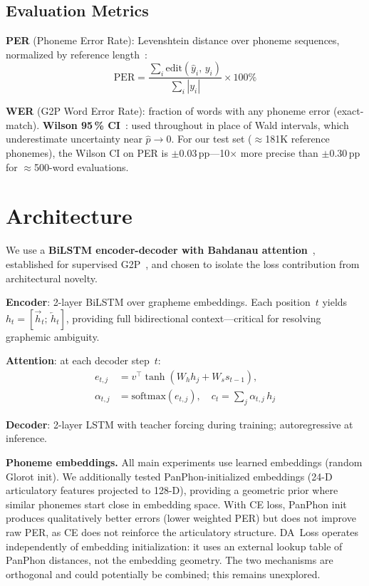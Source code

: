 \documentclass[conference]{IEEEtran}
\begin{document}
\subsection{Evaluation Metrics}

\textbf{PER} (Phoneme Error Rate): Levenshtein distance over phoneme
sequences, normalized by reference length~\cite{bisani2008joint}:
\begin{equation}
  \mathrm{PER} = \frac{\displaystyle\sum_i \mathrm{edit}(\hat{y}_i,\,
                 y_i)}{\displaystyle\sum_i |y_i|} \times 100\%
  \label{eq:per}
\end{equation}

\textbf{WER} (G2P Word Error Rate): fraction of words with any
phoneme error (exact-match).
\textbf{Wilson 95\,\% CI}~\cite{wilson1927probable,brown2001interval}:
used throughout in place of Wald intervals, which underestimate
uncertainty near $\hat{p}\!\to\!0$.
For our test set ($\approx$181K reference phonemes), the Wilson CI on
PER is $\pm$0.03\,pp---10$\times$ more precise than
$\pm$0.30\,pp for $\approx$500-word evaluations.

\section{Architecture}

We use a \textbf{BiLSTM encoder-decoder with Bahdanau
attention}~\cite{bahdanau2014neural}, established for supervised
G2P~\cite{rao2015g2p}, and chosen to isolate the loss contribution
from architectural novelty.

\textbf{Encoder}: 2-layer BiLSTM over grapheme embeddings.
Each position~$t$ yields $h_t\!=\![\overrightarrow{h}_t;\,
\overleftarrow{h}_t]$, providing full bidirectional context---critical
for resolving graphemic ambiguity.

\textbf{Attention}: at each decoder step~$t$:
\begin{align}
  e_{t,j} &= v^\top \tanh(W_h h_j + W_s s_{t-1}), \nonumber \\
  \alpha_{t,j} &= \mathrm{softmax}(e_{t,j}), \quad
  c_t = \textstyle\sum_j \alpha_{t,j}\, h_j
  \label{eq:attention}
\end{align}

\textbf{Decoder}: 2-layer LSTM with teacher forcing during training;
autoregressive at inference.

\textbf{Phoneme embeddings.}
All main experiments use learned embeddings (random Glorot init).
We additionally tested PanPhon-initialized embeddings (24-D
articulatory features projected to 128-D), providing a geometric
prior where similar phonemes start close in embedding space.
With CE loss, PanPhon init produces qualitatively better errors
(lower weighted PER) but does not improve raw PER, as CE does not
reinforce the articulatory structure.
DA~Loss operates independently of embedding initialization: it uses
an external lookup table of PanPhon distances, not the embedding
geometry.
The two mechanisms are orthogonal and could potentially be combined;
this remains unexplored.
\end{document}
